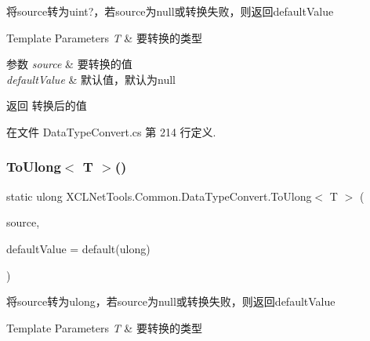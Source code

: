 将source转为uint?，若source为null或转换失败，则返回default\+Value 


\begin{DoxyTemplParams}{Template Parameters}
{\em T} & 要转换的类型\\
\hline
\end{DoxyTemplParams}

\begin{DoxyParams}{参数}
{\em source} & 要转换的值\\
\hline
{\em default\+Value} & 默认值，默认为null\\
\hline
\end{DoxyParams}
\begin{DoxyReturn}{返回}
转换后的值
\end{DoxyReturn}


在文件 Data\+Type\+Convert.\+cs 第 214 行定义.

\mbox{\label{class_x_c_l_net_tools_1_1_common_1_1_data_type_convert_ab4e2db26e84855a2f64cdde1e683e5bc}} 
\subsubsection{\texorpdfstring{To\+Ulong$<$ T $>$()}{ToUlong< T >()}}
{\footnotesize\ttfamily static ulong X\+C\+L\+Net\+Tools.\+Common.\+Data\+Type\+Convert.\+To\+Ulong$<$ T $>$ (\begin{DoxyParamCaption}\item[{T}]{source,  }\item[{ulong}]{default\+Value = {\ttfamily default(ulong)} }\end{DoxyParamCaption})\hspace{0.3cm}{\ttfamily [static]}}



将source转为ulong，若source为null或转换失败，则返回default\+Value 


\begin{DoxyTemplParams}{Template Parameters}
{\em T} & 要转换的类型\\
\hline
\end{DoxyTemplParams}

